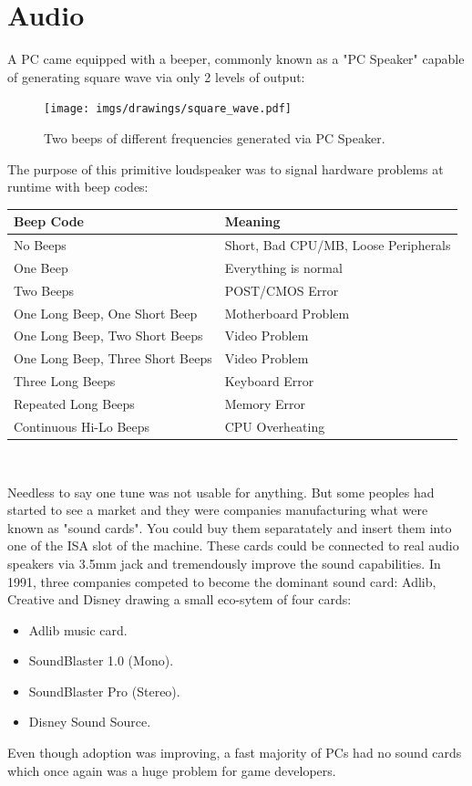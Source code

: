 \documentclass[book.tex]{subfiles}
\begin{document}
\section{Audio}
A PC came equipped with a beeper, commonly known as a "PC Speaker" capable of generating square wave via only 2 levels of output:\\
\par
 \begin{figure}[H]
\centering
\texttt{[image: imgs/drawings/square\_wave.pdf]}
\caption{Two beeps of different frequencies generated via PC Speaker.}
\end{figure}

\par
 The purpose of this primitive loudspeaker was to signal hardware problems at runtime with beep codes:\\
\par
\begin{tabularx}{\textwidth}{l l}
\textbf{Beep Code} & \textbf{Meaning}  \\ \hline
No Beeps                         & Short, Bad CPU/MB, Loose Peripherals \\ \hline
One Beep                         & Everything is normal\\ \hline
Two Beeps                        & POST/CMOS Error \\ \hline 
One Long Beep, One Short Beep    & Motherboard Problem \\ \hline
One Long Beep, Two Short Beeps   & Video Problem \\ \hline
One Long Beep, Three Short Beeps & Video Problem \\ \hline
Three Long Beeps                 & Keyboard Error \\ \hline
Repeated Long Beeps              & Memory Error \\ \hline
Continuous Hi-Lo Beeps           & CPU Overheating \\ \hline
\end{tabularx}\\
\bigskip
\par
Needless to say one tune was not usable for anything. But some peoples had started to see a market and they were companies manufacturing what were known as "sound cards". You could buy them separatately and insert them into one of the ISA slot of the machine. These cards could be connected to real audio speakers via 3.5mm jack and tremendously improve the sound capabilities. In 1991, three companies competed to become the dominant sound card: Adlib, Creative and Disney drawing a small eco-sytem of four cards:\\
\par
\begin{itemize}
\item Adlib music card.
\item SoundBlaster 1.0 (Mono).
\item SoundBlaster Pro (Stereo).
\item Disney Sound Source.
\end{itemize}
\par
Even though adoption was improving, a fast majority of PCs had no sound cards which once again was a huge problem for game developers.
\end{document}
